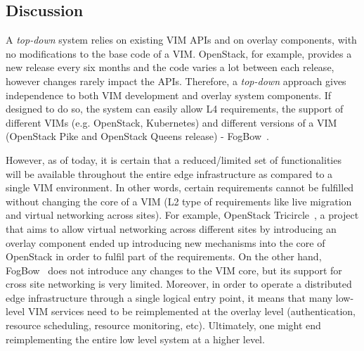 


\subsection{Discussion}
\label{sec:design_discussion}


A \emph{top-down} system  relies on existing VIM APIs and on overlay components, with no modifications to the base code of a VIM.
OpenStack, for example, provides a new release every six months and the code varies a lot between each release, however changes rarely impact the APIs.  Therefore, a \emph{top-down} approach gives independence to both VIM development and overlay system components. 
If designed to do so, the system can easily allow L4 requirements, \ie the support of different VIMs (e.g. OpenStack, Kubernetes) and different versions of a VIM (\eg OpenStack Pike and OpenStack Queens release) - \eg FogBow~\cite{brasileiro2016fogbow}.


However, as of today, it is certain that a reduced/limited set of functionalities will be available throughout the entire edge infrastructure as compared to a single VIM environment. In other words, certain requirements cannot be fulfilled without changing the core of a VIM (\eg L2 type of requirements like live migration and virtual networking across sites). For example, OpenStack Tricircle~\cite{tricircle}, a project that aims to allow virtual networking across different sites by introducing an overlay component ended up introducing new mechanisms into the core of OpenStack in order to fulfil part of the requirements. On the other hand, FogBow~\cite{brasileiro2016fogbow} does not introduce any changes to the VIM core, but its support for cross site networking is very limited.
Moreover, in order to operate a distributed edge infrastructure through a single logical entry point, it means that many low-level VIM services need to be reimplemented at the overlay level (\eg authentication, resource scheduling, resource monitoring, etc). Ultimately, one might end reimplementing the entire low level system at a higher level.






